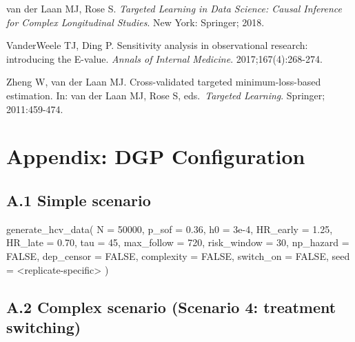 \documentclass[
  letterpaper,
  DIV=11,
  numbers=noendperiod]{scrartcl}
\newenvironment{Shaded}{\begin{snugshade}}{\end{snugshade}}
\newcommand{\AttributeTok}[1]{\textcolor[rgb]{0.40,0.45,0.13}{#1}}
\newcommand{\ConstantTok}[1]{\textcolor[rgb]{0.56,0.35,0.01}{#1}}
\newcommand{\DecValTok}[1]{\textcolor[rgb]{0.68,0.00,0.00}{#1}}
\newcommand{\FloatTok}[1]{\textcolor[rgb]{0.68,0.00,0.00}{#1}}
\newcommand{\FunctionTok}[1]{\textcolor[rgb]{0.28,0.35,0.67}{#1}}
\newcommand{\NormalTok}[1]{\textcolor[rgb]{0.00,0.23,0.31}{#1}}
\newcommand{\SpecialCharTok}[1]{\textcolor[rgb]{0.37,0.37,0.37}{#1}}
\begin{document}
van der Laan MJ, Rose S. \emph{Targeted Learning in Data Science: Causal
Inference for Complex Longitudinal Studies}. New York: Springer; 2018.

VanderWeele TJ, Ding P. Sensitivity analysis in observational research:
introducing the E-value. \emph{Annals of Internal Medicine}.
2017;167(4):268-274.

Zheng W, van der Laan MJ. Cross-validated targeted minimum-loss-based
estimation. In: van der Laan MJ, Rose S, eds.~\emph{Targeted Learning}.
Springer; 2011:459-474.

\section{Appendix: DGP Configuration}\label{appendix-dgp-configuration}

\subsection{A.1 Simple scenario}\label{a.1-simple-scenario}

\begin{Shaded}
\begin{Highlighting}[]
\FunctionTok{generate\_hcv\_data}\NormalTok{(}
  \AttributeTok{N           =} \DecValTok{50000}\NormalTok{,}
  \AttributeTok{p\_sof       =} \FloatTok{0.36}\NormalTok{,}
  \AttributeTok{h0          =} \FloatTok{3e{-}4}\NormalTok{,}
  \AttributeTok{HR\_early    =} \FloatTok{1.25}\NormalTok{,}
  \AttributeTok{HR\_late     =} \FloatTok{0.70}\NormalTok{,}
  \AttributeTok{tau         =} \DecValTok{45}\NormalTok{,}
  \AttributeTok{max\_follow  =} \DecValTok{720}\NormalTok{,}
  \AttributeTok{risk\_window =} \DecValTok{30}\NormalTok{,}
  \AttributeTok{np\_hazard   =} \ConstantTok{FALSE}\NormalTok{,}
  \AttributeTok{dep\_censor  =} \ConstantTok{FALSE}\NormalTok{,}
  \AttributeTok{complexity  =} \ConstantTok{FALSE}\NormalTok{,}
  \AttributeTok{switch\_on   =} \ConstantTok{FALSE}\NormalTok{,}
  \AttributeTok{seed        =} \SpecialCharTok{\textless{}}\NormalTok{replicate}\SpecialCharTok{{-}}\NormalTok{specific}\SpecialCharTok{\textgreater{}}
\NormalTok{)}
\end{Highlighting}
\end{Shaded}

\subsection{A.2 Complex scenario (Scenario 4: treatment
switching)}\label{a.2-complex-scenario-scenario-4-treatment-switching}
\end{document}
